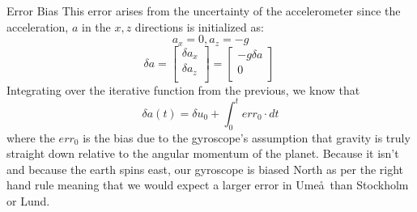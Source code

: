 \documentclass[10pt]{beamer}
\theoremstyle{definition}
\begin{document}
\begin{frame}{Error Bias}
    This error arises from the uncertainty of the accelerometer since the acceleration, $a$ in the $x,z$ directions is initialized as:
    $$
    a_x = 0, a_z = -g
    $$
    $$
    \delta a = 
    \begin{bmatrix}
        \delta a_x \\
        \delta a_z \\
    \end{bmatrix} = 
    \begin{bmatrix} 
        -g \delta a \\
        0           \\
    \end{bmatrix}
    \
    $$
    Integrating over the iterative function from the previous, we know that
    $$
    \delta a(t) = \delta u_0 + \int_0^t err_0 \cdot dt
    $$
    where the $err_0$ is the bias due to the gyroscope's assumption that gravity is truly straight down relative to the angular momentum of the planet. Because it isn't and because the earth spins east, our gyroscope is biased North as per the right hand rule meaning that we would expect a larger error in Ume\aa~than Stockholm or Lund.
\end{frame}
\end{document}
